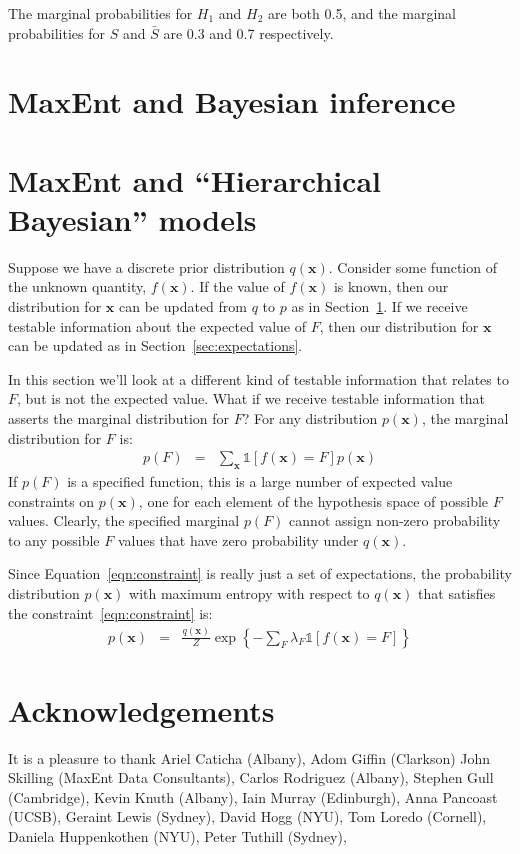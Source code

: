 \documentclass[a4paper, 11pt]{article}
\newcommand{\xx}{\boldsymbol{x}}
\begin{document}
The marginal probabilities for $H_1$ and $H_2$ are both 0.5, and the
marginal probabilities for $S$ and $\bar{S}$ are 0.3 and 0.7 respectively.


\section{MaxEnt and Bayesian inference}\label{sec:bayes}

\section{MaxEnt and ``Hierarchical Bayesian'' models}
Suppose we have a discrete prior distribution $q(\xx)$. Consider some
function of the unknown quantity, $f(\xx)$.
If the value of $f(\xx)$ is known, then our distribution for $\xx$ can
be updated from $q$ to $p$ as in Section~\ref{sec:bayes}.
If we receive testable information
about the expected value of $F$, then our distribution for $\xx$ can
be updated as in Section~\ref{sec:expectations}.

In this section we'll look at a different kind of testable information that
relates to $F$, but is not the expected value. What if we receive testable
information that asserts the marginal distribution for $F$?
For any distribution $p(\xx)$, the marginal distribution for $F$ is:
\begin{eqnarray}
p(F) &=& \sum_{\xx}\mathds{1}\left[f(\xx) = F\right]p(\xx)\label{eqn:constraint}
\end{eqnarray}
If $p(F)$ is a specified function, this is a large number of expected
value constraints on $p(\xx)$, one for each element of the hypothesis space
of possible $F$ values. Clearly, the specified marginal $p(F)$ cannot assign
non-zero probability to any possible $F$ values that have zero probability
under $q(\xx)$.

Since Equation~\ref{eqn:constraint} is really just a set of expectations,
the probability distribution
$p(\xx)$ with maximum entropy with respect to $q(\xx)$ that satisfies the
constraint~\ref{eqn:constraint} is:
\begin{eqnarray}
p(\xx) &=& \frac{q(\xx)}{Z}\exp\left\{-\sum_F \lambda_F \mathds{1}
\left[f(\xx) = F\right]  \right\}
\end{eqnarray}


\section*{Acknowledgements}
It is a pleasure to thank
Ariel Caticha (Albany),
Adom Giffin (Clarkson)
John Skilling (MaxEnt Data Consultants),
Carlos Rodriguez (Albany),
Stephen Gull (Cambridge),
Kevin Knuth (Albany),
Iain Murray (Edinburgh),
Anna Pancoast (UCSB),
Geraint Lewis (Sydney),
David Hogg (NYU),
Tom Loredo (Cornell),
Daniela Huppenkothen (NYU),
Peter Tuthill (Sydney),
\end{document}

